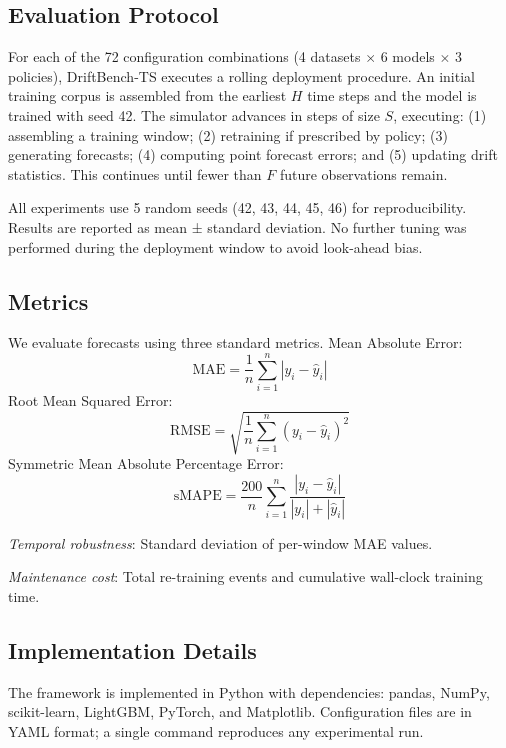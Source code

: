 \documentclass[conference]{IEEEtran}
\begin{document}
\subsection{Evaluation Protocol}

For each of the 72 configuration combinations (4 datasets
$\times$ 6 models $\times$ 3 policies), DriftBench-TS executes a
rolling deployment procedure. An initial training corpus is assembled
from the earliest $H$ time steps and the model is trained with seed 42.
The simulator advances in steps of size $S$, executing: (1) assembling
a training window; (2) retraining if prescribed by policy; (3)
generating forecasts; (4) computing point forecast errors; and (5)
updating drift statistics. This continues until fewer than $F$
future observations remain.

All experiments use 5 random seeds (42, 43, 44, 45, 46) for reproducibility. Results are reported as mean ± standard deviation. No further tuning was performed during
the deployment window to avoid look-ahead bias.

\subsection{Metrics}

We evaluate forecasts using three standard metrics. Mean Absolute Error:
\begin{equation}
	\text{MAE} = \frac{1}{n}\sum_{i=1}^{n}|y_i - \hat{y}_i|
\end{equation}
Root Mean Squared Error:
\begin{equation}
	\text{RMSE} = \sqrt{\frac{1}{n}\sum_{i=1}^{n}(y_i - \hat{y}_i)^2}
\end{equation}
Symmetric Mean Absolute Percentage Error:
\begin{equation}
	\text{sMAPE} = \frac{200}{n}\sum_{i=1}^{n}\frac{|y_i - \hat{y}_i|}{|y_i| + |\hat{y}_i|}
\end{equation}

\textit{Temporal robustness}: Standard deviation of per-window MAE
values.

\textit{Maintenance cost}: Total re-training events and cumulative
wall-clock training time.

\subsection{Implementation Details}

The framework is implemented in Python with dependencies: pandas,
NumPy, scikit-learn, LightGBM, PyTorch, and Matplotlib. Configuration
files are in YAML format; a single command reproduces any experimental
run.
\end{document}
